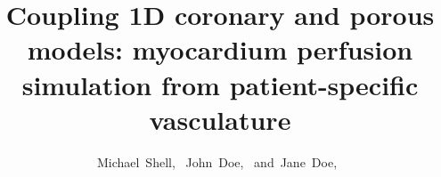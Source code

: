 \documentclass[journal]{IEEEtran}
\begin{document}
%
\title{Coupling 1D coronary and porous models: myocardium perfusion simulation from patient-specific vasculature}
%
%
%

\author{Michael~Shell,~
        John~Doe,~
        and~Jane~Doe,~%
}

% 
%
\end{document}
